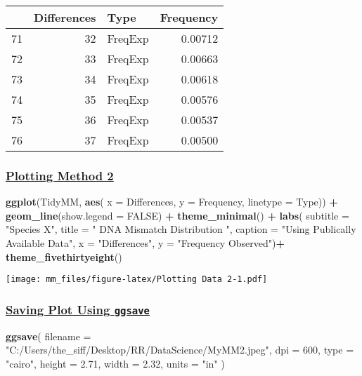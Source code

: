 \documentclass[]{article}
\newenvironment{Shaded}{\begin{snugshade}}{\end{snugshade}}
\newcommand{\KeywordTok}[1]{\textcolor[rgb]{0.13,0.29,0.53}{\textbf{#1}}}
\newcommand{\DataTypeTok}[1]{\textcolor[rgb]{0.13,0.29,0.53}{#1}}
\newcommand{\DecValTok}[1]{\textcolor[rgb]{0.00,0.00,0.81}{#1}}
\newcommand{\FloatTok}[1]{\textcolor[rgb]{0.00,0.00,0.81}{#1}}
\newcommand{\StringTok}[1]{\textcolor[rgb]{0.31,0.60,0.02}{#1}}
\newcommand{\OtherTok}[1]{\textcolor[rgb]{0.56,0.35,0.01}{#1}}
\newcommand{\OperatorTok}[1]{\textcolor[rgb]{0.81,0.36,0.00}{\textbf{#1}}}
\newcommand{\NormalTok}[1]{#1}
\begin{document}
\begin{longtable}[]{@{}lrlr@{}}
\toprule
& Differences & Type & Frequency\tabularnewline
\midrule
\endhead
71 & 32 & FreqExp & 0.00712\tabularnewline
72 & 33 & FreqExp & 0.00663\tabularnewline
73 & 34 & FreqExp & 0.00618\tabularnewline
74 & 35 & FreqExp & 0.00576\tabularnewline
75 & 36 & FreqExp & 0.00537\tabularnewline
76 & 37 & FreqExp & 0.00500\tabularnewline
\bottomrule
\end{longtable}

\subsubsection{\texorpdfstring{\href{sheading-2}{Plotting Method
2}}{Plotting Method 2}}\label{plotting-method-2}

\begin{Shaded}
\begin{Highlighting}[]
\KeywordTok{ggplot}\NormalTok{(TidyMM, }\KeywordTok{aes}\NormalTok{(}
  \DataTypeTok{x =}\NormalTok{ Differences, }
  \DataTypeTok{y =}\NormalTok{ Frequency, }
  \DataTypeTok{linetype =}\NormalTok{ Type)) }\OperatorTok{+}
\StringTok{  }\KeywordTok{geom_line}\NormalTok{(}\DataTypeTok{show.legend =} \OtherTok{FALSE}\NormalTok{) }\OperatorTok{+}
\StringTok{  }\KeywordTok{theme_minimal}\NormalTok{() }\OperatorTok{+}
\StringTok{  }\KeywordTok{labs}\NormalTok{(}
    \DataTypeTok{subtitle =} \StringTok{"Species X"}\NormalTok{,}
    \DataTypeTok{title =} \StringTok{" DNA Mismatch Distribution "}\NormalTok{,}
    \DataTypeTok{caption =} \StringTok{"Using Publically Available Data"}\NormalTok{,}
    \DataTypeTok{x =} \StringTok{"Differences"}\NormalTok{,}
    \DataTypeTok{y =} \StringTok{"Frequency Observed"}\NormalTok{)}\OperatorTok{+}
\StringTok{  }\KeywordTok{theme_fivethirtyeight}\NormalTok{()}
\end{Highlighting}
\end{Shaded}

\texttt{[image: mm\_files/figure-latex/Plotting Data 2-1.pdf]}

\subsubsection{\texorpdfstring{\href{sheading-2}{Saving Plot Using
\texttt{ggsave}}}{Saving Plot Using ggsave}}\label{saving-plot-using-ggsave-1}

\begin{Shaded}
\begin{Highlighting}[]
\KeywordTok{ggsave}\NormalTok{(}
  \DataTypeTok{filename =} \StringTok{"C:/Users/the_siff/Desktop/RR/DataScience/MyMM2.jpeg"}\NormalTok{,}
  \DataTypeTok{dpi =} \DecValTok{600}\NormalTok{, }\DataTypeTok{type =} \StringTok{"cairo"}\NormalTok{,}
  \DataTypeTok{height =} \FloatTok{2.71}\NormalTok{,}
  \DataTypeTok{width  =} \FloatTok{2.32}\NormalTok{,}
  \DataTypeTok{units =} \StringTok{"in"}
\NormalTok{)}
\end{Highlighting}
\end{Shaded}
\end{document}

